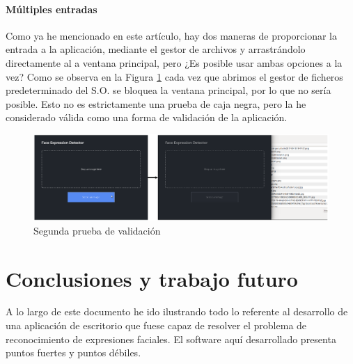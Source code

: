 \documentclass[a4paper,11pt]{book}
\begin{document}
\subsubsection{Múltiples entradas}
Como ya he mencionado en este artículo, hay dos maneras de proporcionar la entrada a la aplicación, mediante el gestor de archivos y arrastrándolo directamente al a ventana principal, pero ¿Es posible usar ambas opciones a la vez? Como se observa en la Figura \ref{fig:validacion03} cada vez que abrimos el gestor de ficheros predeterminado del S.O. se bloquea la ventana principal, por lo que no sería posible. Esto no es estrictamente una prueba de caja negra, pero la he considerado válida como una forma de validación de la aplicación.\\

\begin{figure}[h]
\centering
\includegraphics[width=1.0\linewidth]{imagenes/validacion03}
\caption[Segunda prueba de validación]{Segunda prueba de validación}
\label{fig:validacion03}
\end{figure}






\chapter{Conclusiones y trabajo futuro}
A lo largo de este documento he ido ilustrando todo lo referente al desarrollo de una aplicación de escritorio que fuese capaz de resolver el problema de reconocimiento de expresiones faciales. El software aquí desarrollado presenta puntos fuertes y puntos débiles.
\end{document}
